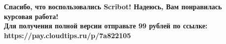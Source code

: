 \begin{center}
    \topskip=0pt
    \vspace*{\fill}
    \textbf{
Спасибо, что воспользовались Scribot! Надеюсь, Вам понравилась курсовая работа!\\
Для получения полной версии отправьте 99 рублей по ссылке:\\
https://pay.cloudtips.ru/p/7a822105\\
}
\end{center}